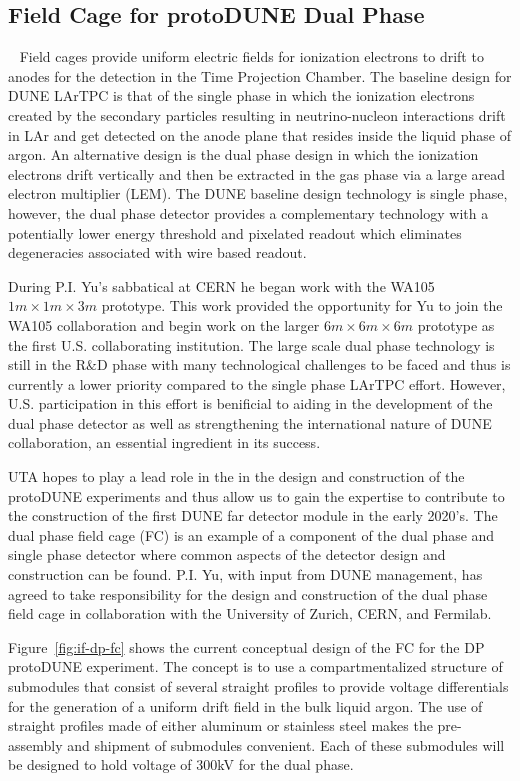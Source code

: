 \subsection{Field Cage for protoDUNE Dual Phase}~\label{sec:proto-dune-dp-fc}
Field cages provide uniform electric fields for ionization electrons to drift to anodes for the detection in the Time Projection Chamber. The baseline design for DUNE LArTPC is that of the single phase in which the ionization electrons created by the secondary particles resulting in neutrino-nucleon interactions drift in LAr and get detected on the anode plane that resides inside the liquid phase of argon. An alternative design is the dual phase design in which the ionization electrons drift vertically and then be extracted in the gas phase via a large aread electron multiplier (LEM). The DUNE baseline design technology is single phase, however, the dual phase detector provides a complementary technology with a potentially lower energy threshold and pixelated readout which eliminates degeneracies associated with wire based readout.

During P.I. Yu's sabbatical at CERN he began work with the WA105 $1m\times 1m\times 3m$ prototype. This work provided the opportunity for Yu to join the WA105 collaboration and begin work on the larger $6m\times 6m\times 6m$ prototype as the first U.S. collaborating institution. The large scale dual phase technology is still in the R$\&$D phase with many technological challenges to be faced and thus is currently a lower priority compared to the single phase LArTPC effort. However, U.S. participation in this effort is benificial to aiding in the development of the dual phase detector as well as strengthening the international nature of DUNE collaboration, an essential ingredient in its success.

UTA hopes to play a lead role in the in the design and construction of the protoDUNE experiments and thus allow us to gain the expertise to contribute to the construction of the first DUNE far detector module in the early 2020's. The dual phase field cage (FC) is an example of a component of the dual phase and single phase detector where common aspects of the detector design and construction can be found. P.I. Yu, with input from DUNE management, has agreed to take responsibility for the design and construction of the dual phase field cage in collaboration with the University of Zurich, CERN, and Fermilab.


Figure~\ref{fig:if-dp-fc} shows the current conceptual design of the FC for the DP protoDUNE experiment.  The concept is to use a compartmentalized structure of submodules that consist of several straight profiles to provide voltage differentials for the generation of a uniform drift field in the bulk liquid argon. The use of straight profiles made of either aluminum or stainless steel makes the pre-assembly and shipment of submodules convenient. Each of these submodules will be designed to hold voltage of 300kV for the dual phase.

